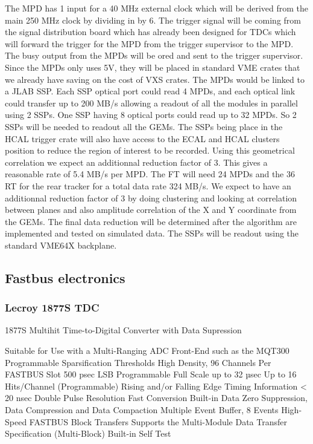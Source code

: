 \documentclass{article}
\begin{document}
The MPD has 1 input for a 40 MHz external clock which will be derived from the main 250 MHz clock by dividing in by 6. The trigger signal will be coming from the signal distribution board which has already been designed for TDCs which will forward the trigger for the MPD from the trigger supervisor to the MPD. The busy output from the MPDs will be ored and sent to the trigger supervisor. Since the MPDs only uses 5V, they will be placed in standard VME crates that we already have saving on the cost of VXS crates.
The MPDs would be linked to a JLAB SSP. Each SSP optical port could read 4 MPDs, and each optical link could transfer up to 200 MB/s allowing a readout of all the modules in parallel using 2 SSPs. One SSP having 8 optical ports could read up to 32 MPDs. So 2 SSPs will be needed to readout all the GEMs. The SSPs being place in the HCAL trigger crate will also have access to the ECAL and HCAL clusters position to reduce the region of interest to be recorded. Using this geometrical correlation we expect an additionnal reduction factor of 3. This gives a reasonable rate of 5.4 MB/s per MPD. The FT will need 24 MPDs and the 36 RT for the rear tracker for a total data rate 324 MB/s. We expect to have an additionnal reduction factor of 3 by doing clustering and looking at correlation between planes and also amplitude correlation of the X and Y coordinate from the GEMs. The final data reduction will be determined after the algorithm are implemented and tested on simulated data. The SSPs will be readout using the standard VME64X backplane.

\subsection{Fastbus electronics}
\subsubsection{Lecroy 1877S TDC}
1877S Multihit Time-to-Digital Converter with Data Supression

    Suitable for Use with a Multi-Ranging ADC Front-End such as the MQT300
    Programmable Sparsification Thresholds
    High Density, 96 Channels Per FASTBUS Slot
    500 psec LSB
    Programmable Full Scale up to 32 µsec
    Up to 16 Hits/Channel (Programmable)
    Rising and/or Falling Edge Timing Information
    < 20 nsec Double Pulse Resolution
    Fast Conversion
    Built-in Data Zero Suppression, Data Compression and Data Compaction
    Multiple Event Buffer, 8 Events
    High-Speed FASTBUS Block Transfers
    Supports the Multi-Module Data Transfer Specification (Multi-Block)
    Built-in Self Test
    
\end{document}
